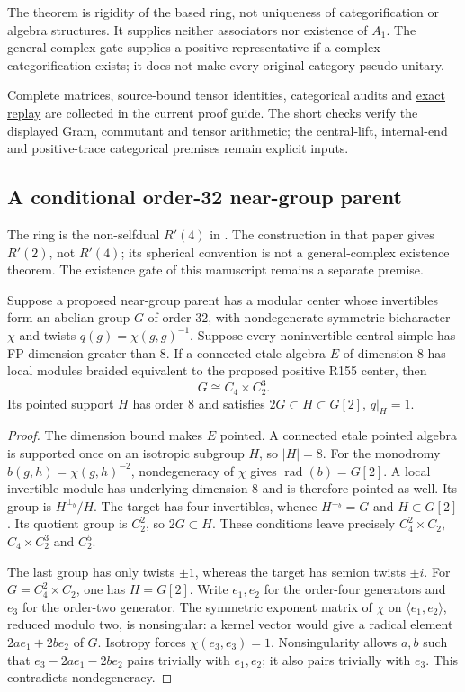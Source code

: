 The theorem is rigidity of the based ring, not uniqueness of
categorification or algebra structures. It supplies neither associators
nor existence of $A_1$. The general-complex gate supplies a positive
representative if a complex categorification exists; it does not make
every original category pseudo-unitary.

Complete matrices, source-bound tensor identities, categorical audits and
\href{https://github.com/sebastienpalcoux/grothendieck-ring-classification/blob/main/evidence/frontier/README.md}{exact replay} are collected in the current proof guide.
The short checks verify the displayed Gram, commutant and tensor arithmetic;
the central-lift, internal-end and positive-trace categorical premises
remain explicit inputs.



\subsection{A conditional order-32 near-group parent}
\label{sec:r155-parent-group}
The ring is the non-selfdual $R'(4)$ in \cite[Theorems~1.1 and~4.8]{MY}.
The construction in that paper gives $R'(2)$, not $R'(4)$; its spherical
convention is not a general-complex existence theorem. The existence gate
of this manuscript remains a separate premise.

\begin{proposition}
Suppose a proposed near-group parent has a modular center whose
invertibles form an abelian group $G$ of order $32$, with nondegenerate
symmetric bicharacter $\chi$ and twists $q(g)=\chi(g,g)^{-1}$. Suppose
every noninvertible central simple has FP dimension greater than $8$.
If a connected etale algebra $E$ of dimension $8$ has local modules
braided equivalent to the proposed positive R155 center, then
\[
G\cong C_4\times C_2^3.
\]
Its pointed support $H$ has order $8$ and satisfies
$2G\subset H\subset G[2]$, $q|_H=1$.
\end{proposition}
\begin{proof}
The dimension bound makes $E$ pointed. A connected etale pointed
algebra is supported once on an isotropic subgroup $H$, so $|H|=8$.
For the monodromy $b(g,h)=\chi(g,h)^{-2}$, nondegeneracy of $\chi$ gives
$\operatorname{rad}(b)=G[2]$. A local invertible module has underlying
dimension $8$ and is therefore pointed as well. Its group is
$H^{\perp_b}/H$. The target has four invertibles, whence
$H^{\perp_b}=G$ and $H\subset G[2]$. Its quotient group is $C_2^2$, so
$2G\subset H$. These conditions leave precisely
$C_4^2\times C_2$, $C_4\times C_2^3$ and $C_2^5$.

The last group has only twists $\pm1$, whereas the target has semion
twists $\pm i$. For $G=C_4^2\times C_2$, one has $H=G[2]$. Write
$e_1,e_2$ for the order-four generators and $e_3$ for the order-two
generator. The symmetric exponent matrix of $\chi$ on
$\langle e_1,e_2\rangle$, reduced modulo two, is nonsingular: a kernel
vector would give a radical element $2a e_1+2b e_2$ of $G$.
Isotropy forces $\chi(e_3,e_3)=1$. Nonsingularity allows $a,b$ such that
$e_3-2a e_1-2b e_2$ pairs trivially with $e_1,e_2$; it also pairs
trivially with $e_3$. This contradicts nondegeneracy.
\end{proof}

